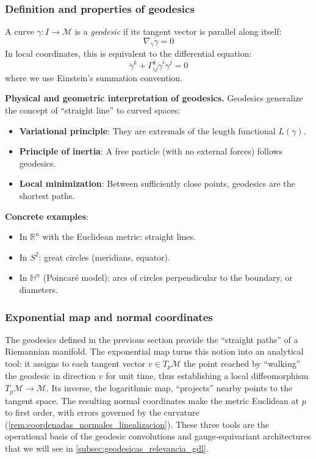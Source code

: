\subsubsection{Definition and properties of geodesics}\label{subsec:geodesicas_definicion}

\begin{definition}[Geodesic]\label{def:geodesica}
A curve $\gamma: I \to \mathcal{M}$ is a \textit{geodesic} if its tangent vector is parallel along itself:
\[
\nabla_{\dot{\gamma}} \dot{\gamma} = 0
\]
In local coordinates, this is equivalent to the differential equation:
\[
\ddot{\gamma}^k + \Gamma^k_{ij} \dot{\gamma}^i \dot{\gamma}^j = 0
\]
where we use Einstein's summation convention.
\end{definition}

\textbf{Physical and geometric interpretation of geodesics.}\label{rem:interpretacion_geodesicas} Geodesics generalize the concept of ``straight line'' to curved spaces:
\begin{itemize}
	\item \textbf{Variational principle}: They are extremals of the length functional $L(\gamma)$.
	\item \textbf{Principle of inertia}: A free particle (with no external forces) follows geodesics.
	\item \textbf{Local minimization}: Between sufficiently close points, geodesics are the shortest paths.
\end{itemize}

\textbf{Concrete examples}:
\begin{itemize}
	\item In $\mathbb{R}^n$ with the Euclidean metric: straight lines.
	\item In $S^2$: great circles (meridians, equator).
	\item In $\mathbb{H}^n$ (Poincaré model): arcs of circles perpendicular to the boundary, or diameters.
\end{itemize}

\subsubsection{Exponential map and normal coordinates}\label{subsec:mapa_exponencial}

The geodesics defined in the previous section provide the ``straight paths'' of a Riemannian manifold. The exponential map turns this notion into an analytical tool: it assigns to each tangent vector $v \in T_p\mathcal{M}$ the point reached by ``walking'' the geodesic in direction $v$ for unit time, thus establishing a local diffeomorphism $T_p\mathcal{M} \to \mathcal{M}$. Its inverse, the logarithmic map, ``projects'' nearby points to the tangent space. The resulting normal coordinates make the metric Euclidean at $p$ to first order, with errors governed by the curvature (\autoref{rem:coordenadas_normales_linealizacion}). These three tools are the operational basis of the geodesic convolutions and gauge-equivariant architectures that we will see in \autoref{subsec:geodesicas_relevancia_gdl}.

